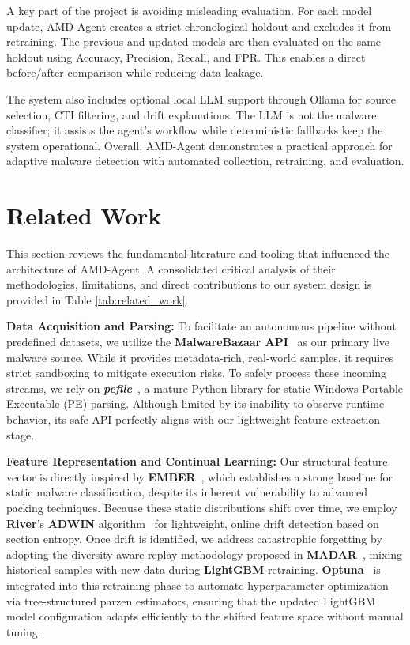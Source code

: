 \documentclass[letterpaper,10pt,conference]{ieeeconf}
\begin{document}
A key part of the project is avoiding misleading evaluation. For each model update, AMD-Agent creates a strict chronological holdout and excludes it from retraining. The previous and updated models are then evaluated on the same holdout using Accuracy, Precision, Recall, and FPR. This enables a direct before/after comparison while reducing data leakage.

The system also includes optional local LLM support through Ollama for source selection, CTI filtering, and drift explanations. The LLM is not the malware classifier; it assists the agent’s workflow while deterministic fallbacks keep the system operational. Overall, AMD-Agent demonstrates a practical approach for adaptive malware detection with automated collection, retraining, and evaluation.

\section{Related Work}

This section reviews the fundamental literature and tooling that influenced the architecture of AMD-Agent. A consolidated critical analysis of their methodologies, limitations, and direct contributions to our system design is provided in Table \ref{tab:related_work}.

\textbf{Data Acquisition and Parsing:} To facilitate an autonomous pipeline without predefined datasets, we utilize the \textbf{MalwareBazaar API}~\cite{malwarebazaar} as our primary live malware source. While it provides metadata-rich, real-world samples, it requires strict sandboxing to mitigate execution risks. To safely process these incoming streams, we rely on \textbf{\textit{pefile}}~\cite{pefile}, a mature Python library for static Windows Portable Executable (PE) parsing. Although limited by its inability to observe runtime behavior, its safe API perfectly aligns with our lightweight feature extraction stage.

\textbf{Feature Representation and Continual Learning:} Our structural feature vector is directly inspired by \textbf{EMBER}~\cite{anderson2018ember}, which establishes a strong baseline for static malware classification, despite its inherent vulnerability to advanced packing techniques. Because these static distributions shift over time, we employ \textbf{River}'s \textbf{ADWIN} algorithm~\cite{riveradwin} for lightweight, online drift detection based on section entropy. Once drift is identified, we address catastrophic forgetting by adopting the diversity-aware replay methodology proposed in \textbf{MADAR}~\cite{rahman2025madar}, mixing historical samples with new data during \textbf{LightGBM} retraining. \textbf{Optuna}~\cite{akiba2019optuna} is integrated into this retraining phase to automate hyperparameter optimization via tree-structured parzen estimators, ensuring that the updated LightGBM model configuration adapts efficiently to the shifted feature space without manual tuning.
\end{document}
